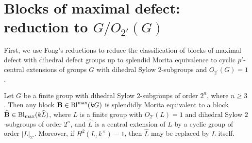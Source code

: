 
\section{Blocks of maximal defect: reduction to \texorpdfstring{$G/O_{2'}(G)$}{G/O2'(G)}}\label{sec:4}%



\noindent First, we use Fong's reductions to reduce the classification of blocks of maximal defect with dihedral defect groups up to splendid Morita equivalence to cyclic $p'$-central extensions of groups $G$ with dihedral Sylow $2$-subgroups and $O_{2^\prime}(G)=1$. 

\begin{lem}\label{lem:Fong2ndredDihedral}%
     Let $G$ be a finite group with dihedral Sylow $2$-subgroups of order $2^n$, where $n\geq 3$. Then any block ${\mathbf{B}}\in\operatorname{Bl}^{\max}(kG)$ is splendidly Morita equivalent to a block $\widehat{{\mathbf{B}}}\in\operatorname{Bl}_{\max}(k\widehat{L})$, where $L$ is a finite group with  $O_{2'}(L)=1$ and dihedral Sylow $2$-subgroups of order $2^n$,  and $\widehat{L}$ is a central extension of $L$ by a cyclic group of order $|L|_{2'}$. Moreover, if $H^2(L,k^\times)=1$, then $\widehat{L}$ may be replaced by $L$ itself.
\end{lem}


